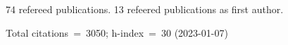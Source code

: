 74 refereed publications. 13 refeered publications as first author.

Total citations~=~3050; h-index~=~30 (2023-01-07)